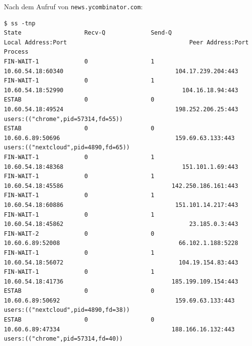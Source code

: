 Nach dem Aufruf von \texttt{news.ycombinator.com}:

\begin{verbatim}
$ ss -tnp
State                  Recv-Q             Send-Q                                                    Local Address:Port                                   Peer Address:Port             Process
FIN-WAIT-1             0                  1                                                           10.60.54.18:60340                                104.17.239.204:443
FIN-WAIT-1             0                  1                                                           10.60.54.18:52990                                  104.16.18.94:443
ESTAB                  0                  0                                                           10.60.54.18:49524                                198.252.206.25:443               users:(("chrome",pid=57314,fd=55))
ESTAB                  0                  0                                                            10.60.6.89:50696                                 159.69.63.133:443               users:(("nextcloud",pid=4890,fd=65))
FIN-WAIT-1             0                  1                                                           10.60.54.18:48368                                  151.101.1.69:443
FIN-WAIT-1             0                  1                                                           10.60.54.18:45586                               142.250.186.161:443
FIN-WAIT-1             0                  1                                                           10.60.54.18:60886                                151.101.14.217:443
FIN-WAIT-1             0                  1                                                           10.60.54.18:45862                                    23.185.0.3:443
FIN-WAIT-2             0                  0                                                            10.60.6.89:52008                                  66.102.1.188:5228
FIN-WAIT-1             0                  1                                                           10.60.54.18:56072                                 104.19.154.83:443
FIN-WAIT-1             0                  1                                                           10.60.54.18:41736                               185.199.109.154:443
ESTAB                  0                  0                                                            10.60.6.89:50692                                 159.69.63.133:443               users:(("nextcloud",pid=4890,fd=38))
ESTAB                  0                  0                                                            10.60.6.89:47334                                188.166.16.132:443               users:(("chrome",pid=57314,fd=40))

\end{verbatim}
